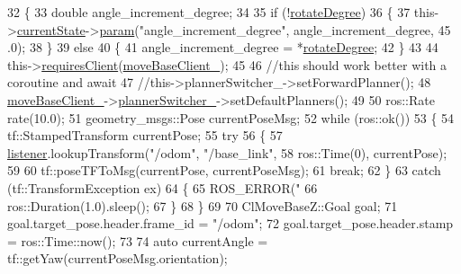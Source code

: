 \begin{DoxyCode}
32     \{
33         \textcolor{keywordtype}{double} angle\_increment\_degree;
34 
35         \textcolor{keywordflow}{if} (!\hyperlink{classmove__base__z__client_1_1CbRotate_a30d0f24b857149d78a023635562516b6}{rotateDegree})
36         \{
37             this->\hyperlink{classsmacc_1_1SmaccClientBehavior_af76fc9b877542ed5caf033f820c107d0}{currentState}->\hyperlink{classsmacc_1_1ISmaccState_a4982f2187ed6da337462721146e8ef70}{param}(\textcolor{stringliteral}{"angle\_increment\_degree"}, angle\_increment\_degree, 45
      .0);
38         \}
39         \textcolor{keywordflow}{else}
40         \{
41             angle\_increment\_degree = *\hyperlink{classmove__base__z__client_1_1CbRotate_a30d0f24b857149d78a023635562516b6}{rotateDegree};
42         \}
43 
44         this->\hyperlink{classsmacc_1_1SmaccClientBehavior_a917f001e763a1059af337bf4e164f542}{requiresClient}(\hyperlink{classmove__base__z__client_1_1CbRotate_a292c3739c4c1e668c0c6e241127b5c50}{moveBaseClient\_});
45 
46         \textcolor{comment}{//this should work better with a coroutine and await}
47         \textcolor{comment}{//this->plannerSwitcher\_->setForwardPlanner();}
48         \hyperlink{classmove__base__z__client_1_1CbRotate_a292c3739c4c1e668c0c6e241127b5c50}{moveBaseClient\_}->\hyperlink{classmove__base__z__client_1_1ClMoveBaseZ_ac57d2293bc0a5c4fcef326379822cc5e}{plannerSwitcher\_}->setDefaultPlanners();
49 
50         ros::Rate rate(10.0);
51         geometry\_msgs::Pose currentPoseMsg;
52         \textcolor{keywordflow}{while} (ros::ok())
53         \{
54             tf::StampedTransform currentPose;
55             \textcolor{keywordflow}{try}
56             \{
57                 \hyperlink{classmove__base__z__client_1_1CbRotate_ad9afe4d39997d7b44fc304f81f519cc5}{listener}.lookupTransform(\textcolor{stringliteral}{"/odom"}, \textcolor{stringliteral}{"/base\_link"},
58                                          ros::Time(0), currentPose);
59 
60                 tf::poseTFToMsg(currentPose, currentPoseMsg);
61                 \textcolor{keywordflow}{break};
62             \}
63             \textcolor{keywordflow}{catch} (tf::TransformException ex)
64             \{
65                 ROS\_ERROR(\textcolor{stringliteral}{"%
66                 ros::Duration(1.0).sleep();
67             \}
68         \}
69 
70         ClMoveBaseZ::Goal goal;
71         goal.target\_pose.header.frame\_id = \textcolor{stringliteral}{"/odom"};
72         goal.target\_pose.header.stamp = ros::Time::now();
73 
74         \textcolor{keyword}{auto} currentAngle = tf::getYaw(currentPoseMsg.orientation);
}
\end{DoxyCode}
